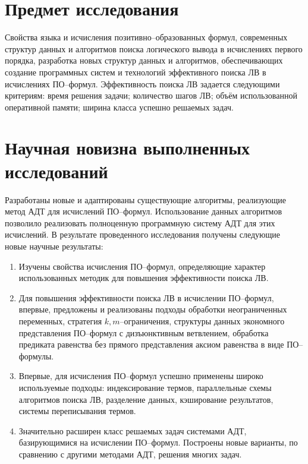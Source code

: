 \section*{Предмет исследования}
Свойства языка и исчисления позитивно--образованных формул, современных структур данных и алгоритмов поиска логического вывода в исчислениях первого порядка, разработка новых структур данных и алгоритмов, обеспечивающих создание программных систем и технологий эффективного поиска ЛВ в исчислениях ПО--формул. Эффективность поиска ЛВ задается следующими критериям: время решения задачи; количество шагов ЛВ; объём использованной оперативной памяти; ширина класса успешно решаемых задач.

\section*{Научная новизна выполненных исследований}
Разработаны новые и адаптированы существующие алгоритмы, реализующие метод АДТ для исчислений ПО--формул. Использование данных алгоритмов позволило реализовать полноценную программную систему АДТ для этих исчислений. В результате проведенного исследования получены следующие новые научные результаты:
\begin{enumerate}
\item Изучены свойства исчисления ПО--формул, определяющие характер использованных методик для повышения эффективности поиска ЛВ.
\item Для повышения эффективности поиска ЛВ в исчислении ПО--формул, впервые, предложены и реализованы подходы обработки неограниченных переменных, стратегия $k,m$--ограничения, структуры данных экономного представления ПО--формул с дизъюнктивным ветвлением, обработка предиката равенства без прямого представления аксиом равенства в виде ПО--формулы.
\item Впервые, для исчисления ПО--формул успешно применены широко используемые подходы: индексирование термов, параллельные схемы алгоритмов поиска ЛВ, разделение данных, кэширование результатов, системы переписывания термов.
\item Значительно расширен класс решаемых задач системами АДТ, базирующимися на исчислении ПО--формул. Построены новые варианты, по сравнению с другими методами АДТ, решения многих задач.
\end{enumerate}


